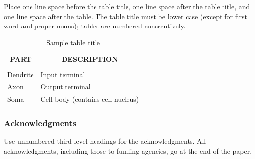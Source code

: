 \documentclass{article} %
\begin{document}
Place one line space before the table title, one line space after the table
title, and one line space after the table. The table title must be lower case
(except for first word and proper nouns); tables are numbered consecutively.

\begin{table}[t]
\caption{Sample table title}
\label{sample-table}
\begin{center}
\begin{tabular}{ll}
\multicolumn{1}{c}{\bf PART}  &\multicolumn{1}{c}{\bf DESCRIPTION}
\\ \hline \\
Dendrite         &Input terminal \\
Axon             &Output terminal \\
Soma             &Cell body (contains cell nucleus) \\
\end{tabular}
\end{center}
\end{table}

\subsubsection*{Acknowledgments}

Use unnumbered third level headings for the acknowledgments. All
acknowledgments, including those to funding agencies, go at the end of the paper.



\end{document}
